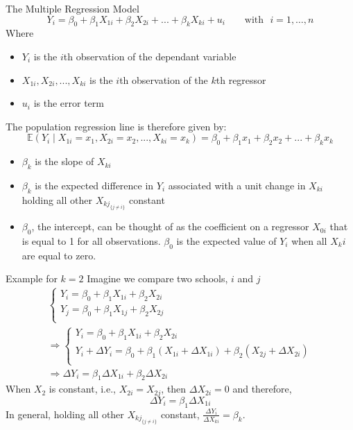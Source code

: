 \documentclass[notes,10pt, aspectratio=169]{beamer}
\begin{document}
\begin{frame}{The Multiple Regression Model }
\begin{equation*}
    Y_i = \beta_{0} + \beta_1 X_{1i} + \beta_2 X_{2i} + ... + \beta_k X_{ki} + u_i \text{~~~~~~with~~} i=1,\dots, n
\end{equation*}
Where
\begin{itemize}
    \item $Y_i$ is the $i$th observation of the dependant variable
    \item $X_{1i}, X_{2i}, ..., X_{ki}$ is the $i$th observation of the $k$th regressor
    \item $u_i$ is the error term
\end{itemize}
\vspace{.5cm}
The population regression line is therefore given by:
\begin{equation*}
     \mathbb{E}(Y_i\mid X_{1i}=x_1, X_{2i}=x_2, ..., X_{ki}=x_k) = \beta_0 + \beta_1 x_1 + \beta_2 x_2 + ... + \beta_k x_k 
\end{equation*}
\begin{itemize}
    \item $\beta_k$ is the slope of $X_{ki}$
    \item $\beta_k$ is the expected difference in $Y_i$ associated with a unit change in $X_{ki}$ holding all other $X_{kj}_{\{j\neq i\}}$ constant
    \item $\beta_0$, the intercept, can be thought of as the coefficient on a regressor $X_{0i}$ that is equal to 1 for all observations. $\beta_0$ is the expected value of $Y_i$ when all $X_ki$ are equal to zero.
\end{itemize}

\end{frame}


\begin{frame}{Example for $k=2$}
Imagine we compare two schools, $i$ and $j$
\begin{eqnarray*}
\begin{cases}
    Y_i = \beta_{0} + \beta_1 X_{1i} + \beta_2 X_{2i}\\
    Y_j = \beta_{0} + \beta_1 X_{1j} + \beta_2 X_{2j}\\
\end{cases}\\
\Rightarrow
\begin{cases}
    Y_i = \beta_{0} + \beta_1 X_{1i} + \beta_2 X_{2i}\\
    Y_i + \Delta Y_i = \beta_{0} + \beta_1 (X_{1i}+ \Delta X_{1i}) + \beta_2 (X_{2j} + \Delta X_{2i})\\
\end{cases}\\
\Rightarrow
\Delta Y_i = \beta_1 \Delta X_{1i} + \beta_2 \Delta X_{2i}
\end{eqnarray*}
When $X_2$ is constant, i.e., $X_{2i}=X_{2j}$, then $\Delta X_{2i}=0$ and therefore,
\begin{equation*}
    \Delta Y_i = \beta_1 \Delta X_{1i}
\end{equation*}
In general, holding all other $X_{kj}_{\{j\neq i\}}$ constant, $\frac{\Delta Y_i}{\Delta X_{ki}}= \beta_k$. 
\end{frame}
\end{document}
